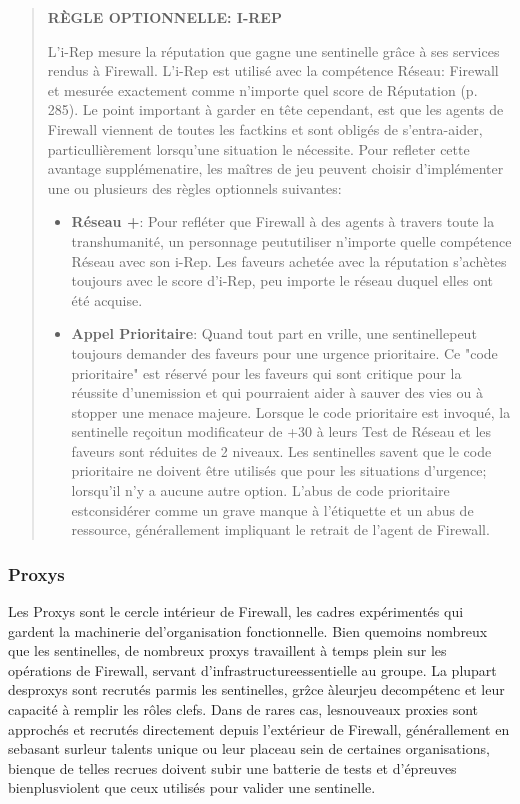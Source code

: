 \begin{quotation} \textbf{RÈGLE OPTIONNELLE: I-REP} 

L'i-Rep mesure la réputation que gagne une sentinelle grâce à ses services rendus à Firewall. L'i-Rep est utilisé avec la compétence Réseau: Firewall et mesurée exactement comme n'importe quel score de Réputation (p. 285). Le point important à garder en tête cependant, est que les agents de Firewall viennent de toutes les factkins et sont obligés de s'entra-aider, particullièrement lorsqu'une situation le nécessite. Pour refleter cette avantage supplémenatire, les maîtres de jeu peuvent choisir d'implémenter une ou plusieurs des règles optionnels suivantes: \begin{itemize} \item \textbf{Réseau +}: Pour refléter que Firewall à des agents à travers toute la transhumanité, un personnage peututiliser n'importe quelle compétence Réseau avec son i-Rep. Les faveurs achetée avec la réputation s'achètes toujours avec le score d'i-Rep, peu importe le réseau duquel elles ont été acquise. \item \textbf{Appel Prioritaire}: Quand tout part en vrille, une sentinellepeut toujours demander des faveurs pour une urgence prioritaire. Ce "code prioritaire" est réservé pour les faveurs qui sont critique pour la réussite d'unemission et qui pourraient aider à sauver des vies ou à stopper une menace majeure. Lorsque le code prioritaire est invoqué, la sentinelle reçoitun modificateur de +30 à leurs Test de Réseau et les faveurs sont réduites de 2 niveaux. Les sentinelles savent que le code prioritaire ne doivent être utilisés que pour les situations d'urgence; lorsqu'il n'y a aucune autre option. L'abus de code prioritaire estconsidérer comme un grave manque à l'étiquette et un abus de ressource, générallement impliquant le retrait de l'agent de Firewall. \end{itemize} \end{quotation} 

\subsubsection{Proxys } 

Les Proxys sont le cercle intérieur de Firewall, les cadres expérimentés qui gardent la machinerie del'organisation fonctionnelle. Bien quemoins nombreux que les sentinelles, de nombreux proxys travaillent à temps plein sur les opérations de Firewall, servant d'infrastructureessentielle au groupe. La plupart desproxys sont recrutés parmis les sentinelles, grẑce àleurjeu decompétenc et leur capacité à remplir les rôles clefs. Dans de rares cas, lesnouveaux proxies sont approchés et recrutés directement depuis l'extérieur de Firewall, générallement en sebasant surleur talents unique ou leur placeau sein de certaines organisations, bienque de telles recrues doivent subir une batterie de tests et d'épreuves bienplusviolent que ceux utilisés pour valider une sentinelle. 


